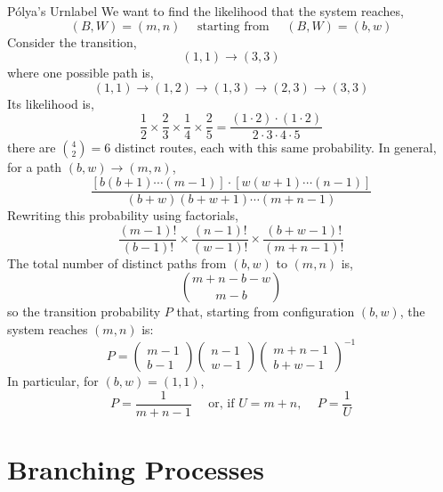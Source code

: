 \documentclass{tufte-handout}
\begin{document}
  \begin{ex}{P\'{o}lya's Urn}{label}
    We want to find the likelihood that the system reaches,
    \[(B, W) = (m,n) \quad \text{ starting from } \quad (B, W) = (b,w)\]
    \noindent Consider the transition,
    \[(1,1) \rightarrow (3,3)\]
    \noindent where one possible path is,
    \[(1,1) \rightarrow (1,2) \rightarrow (1,3) \rightarrow (2,3) \rightarrow (3,3)\]
    Its likelihood is,
    \[\frac{1}{2} \times \frac{2}{3} \times \frac{1}{4} \times \frac{2}{5}=\frac{(1 \cdot 2) \cdot(1 \cdot 2)}{2 \cdot 3 \cdot 4 \cdot 5}\]
    \noindent there are $\binom{4}{2} = 6$ distinct routes, each with this same probability. In general, for a path  $(b,w) \rightarrow (m,n)$,
    \[\frac{[b(b+1) \cdots(m-1)] \cdot[w(w+1) \cdots(n-1)]}{(b+w)(b+w+1) \cdots(m+n-1)}\]
    \noindent Rewriting this probability using factorials,
    \[\frac{(m-1) !}{(b-1) !} \times \frac{(n-1) !}{(w-1) !} \times \frac{(b+w-1) !}{(m+n-1) !}\]
    \noindent 
    The total number of distinct paths from $(b,w)$ to $(m,n)$ is,
    \[\binom{m+n-b-w}{m-b}\]
    \noindent so the transition probability $P$ that, starting from configuration $(b,w)$, the system reaches $(m,n)$ is:
    \[P=\left(\begin{array}{c}
    m-1 \\
    b-1
    \end{array}\right)\left(\begin{array}{c}
    n-1 \\
    w-1
    \end{array}\right)\left(\begin{array}{c}
    m+n-1 \\
    b+w-1
    \end{array}\right)^{-1}\]
  \noindent In particular, for $(b,w) = (1,1)$,
  \[P = \frac{1}{m+n-1} \quad \text{ or, if $U = m+n$, } \quad P = \frac{1}{U}\]
  \end{ex}

  \section{Branching Processes}
\end{document}
